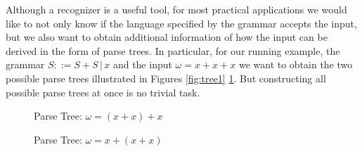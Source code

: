 %
\begin{isabellebody}%
%
%
\isadelimtheory
%
\endisadelimtheory
%
\isatagtheory
%
\endisatagtheory
{\isafoldtheory}%
%
\isadelimtheory
%
\endisadelimtheory
%
\isadelimdocument
%
\endisadelimdocument
%
\isatagdocument
%
\isamarkuptrue%
%
\endisatagdocument
{\isafolddocument}%
%
\isadelimdocument
%
\endisadelimdocument
%
\begin{isamarkuptext}%
Although a recognizer is a useful tool, for most practical applications we would like to not only
know if the language specified by the grammar accepts the input, but we also want to obtain additional information
of how the input can be derived in the form of parse trees. In particular, for our running example, the
grammar $S ::= S + S \, | \, x$ and the input $\omega = x + x + x$ we want to obtain the two possible parse
trees illustrated in Figures \ref{fig:tree1} \ref{fig:tree2}. But constructing all possible parse trees at once is no
trivial task.

\begin{figure}[htpb]
    \centering
    \begin{minipage}{0.45\textwidth}
        \centering
        \caption{Parse Tree: $\omega = (x + x) + x$} \label{fig:tree1}
    \end{minipage}\hfill
    \begin{minipage}{0.45\textwidth}
        \centering
        \caption{Parse Tree: $\omega = x + (x + x)$} \label{fig:tree2}
    \end{minipage}
\end{figure}


\end{isamarkuptext}
\end{isabellebody}
